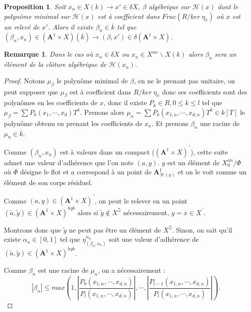 \documentclass[11pt]{article}
\newcommand{\ana}{\mathbf{A}}
\newtheorem{prop}[thm]{Proposition}
\newtheorem{rem}[thm]{Remarque}
\begin{document}
\begin{prop}\label{existence de beta_n qui tends vers beta}
Soit $x_n \in X(k) \rightarrow x' \in \delta X, ~\beta$ algébrique sur $\mathcal{H}(x)$ dont le polynôme minimal sur $\mathcal{H}(x)$ est à coefficient dans $Frac(R/ker~\eta_x)$ où $x$ est un relevé de $x'$. Alors il existe $\beta_n \in \overline{k}$ tel que $(\beta_n, x_n) \in (\ana^1 \times X) (\overline{k}) \rightarrow (\beta, x') \in \delta (\ana^1 \times X)$.
\end{prop}

\begin{rem}
Dans le cas où $x_n \in \delta X$ ou $x_n \in X^{an}\backslash X(k)$ alors $\beta_n$ sera un élément de la clôture algébrique de $\mathcal{H}(x_n)$.
\end{rem}
\begin{proof}
Notons $\mu_\beta$ le polynôme minimal de $\beta$, en ne le prenant pas unitaire, on peut supposer que $\mu_\beta$ est à coefficient dans $R/ker~\eta_x$ donc ses coefficients sont des polynômes en les coefficients de $x$, donc il existe $P_k \in R, 0 \leq k \leq l$ tel que $\mu_\beta = \sum P_k(x_1, \cdots, x_d)T^k$. Prenons alors $\mu_n = \sum P_k(x_{1,n}, \cdots, x_{d,n})T^k \in k[T]$ le polynôme obtenu en prenant les coefficients de $x_n$. Et prenons $\beta_n$ une racine de $\mu_n \in \overline{k}$.

Comme $(\beta_n, x_n)$ est à valeurs dans un compact ($(\ana^1 \times X)^\urcorner$), cette suite admet une valeur d'adhérence que l'on note $(a,y)$. $y$ est un élément de $X^{an}_0/\Phi$  où $\Phi$ désigne le flot et $a$ correspond à un point de $\ana^1_{\mathcal{H}(y)}$ et on le voit comme un élément de son corps résiduel.

Comme $(a,y) \in (\ana^1 \times X)^\urcorner$, on peut le relever en un point $(\tilde{a}, \tilde{y}) \in (\ana^1 \times X)^{hyb}$ alors si $\tilde{y} \notin X^\beth$ nécessairement, $y = x \in X^\urcorner$. 

Montrons donc que $\tilde{y}$ ne peut pas être un élément de $X^\beth$. Sinon, on sait qu'il existe $\alpha_n \in [0,1]$ tel que $\eta_{(\beta_n, x_n)}^{\alpha_n}$ soit une valeur d'adhérence de $(\tilde{a}, \tilde{y}) \in (\ana^1 \times X)^{hyb}$. 

Comme $\beta_n$ est une racine de $\mu_n$, on a nécessairement :
\begin{equation*}
|\beta_n| \leq max(1, | \frac{P_0(x_{1,n}, \cdots, x_{d,n})}{P_l(x_{1,n}, \cdots, x_{d,n})}|, \cdots,| \frac{P_{l-1}(x_{1,n}, \cdots, x_{d,n})}{P_l(x_{1,n}, \cdots, x_{d,n})}|).
\end{equation*} 


\end{proof}
\end{document}
